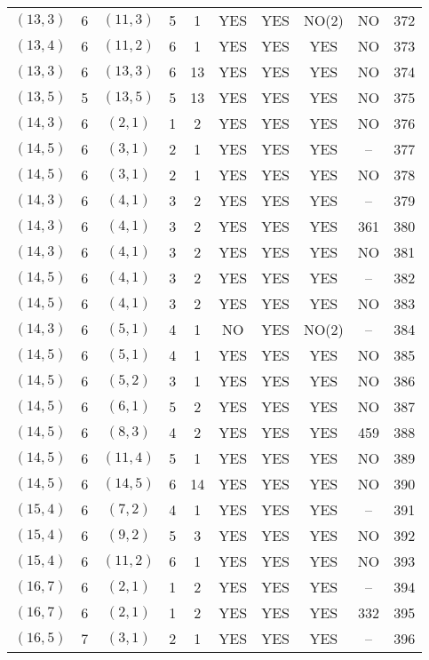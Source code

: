 \begin{longtable}{|c|c|c|c|c|c|c|c|c|c|}
$(13, 3)$ & 6 & $(11, 3)$ & 5 & 1 & YES & YES & NO(2) & NO & 372\\
$(13, 4)$ & 6 & $(11, 2)$ & 6 & 1 & YES & YES & YES & NO & 373\\
$(13, 3)$ & 6 & $(13, 3)$ & 6 & 13 & YES & YES & YES & NO & 374\\
$(13, 5)$ & 5 & $(13, 5)$ & 5 & 13 & YES & YES & YES & NO & 375\\
$(14, 3)$ & 6 & $(2, 1)$ & 1 & 2 & YES & YES & YES & NO & 376\\
$(14, 5)$ & 6 & $(3, 1)$ & 2 & 1 & YES & YES & YES & -- & 377\\
$(14, 5)$ & 6 & $(3, 1)$ & 2 & 1 & YES & YES & YES & NO & 378\\
$(14, 3)$ & 6 & $(4, 1)$ & 3 & 2 & YES & YES & YES & -- & 379\\
$(14, 3)$ & 6 & $(4, 1)$ & 3 & 2 & YES & YES & YES & 361 & 380\\
$(14, 3)$ & 6 & $(4, 1)$ & 3 & 2 & YES & YES & YES & NO & 381\\
$(14, 5)$ & 6 & $(4, 1)$ & 3 & 2 & YES & YES & YES & -- & 382\\
$(14, 5)$ & 6 & $(4, 1)$ & 3 & 2 & YES & YES & YES & NO & 383\\
$(14, 3)$ & 6 & $(5, 1)$ & 4 & 1 & NO & YES & NO(2) & -- & 384\\
$(14, 5)$ & 6 & $(5, 1)$ & 4 & 1 & YES & YES & YES & NO & 385\\
$(14, 5)$ & 6 & $(5, 2)$ & 3 & 1 & YES & YES & YES & NO & 386\\
$(14, 5)$ & 6 & $(6, 1)$ & 5 & 2 & YES & YES & YES & NO & 387\\
$(14, 5)$ & 6 & $(8, 3)$ & 4 & 2 & YES & YES & YES & 459 & 388\\
$(14, 5)$ & 6 & $(11, 4)$ & 5 & 1 & YES & YES & YES & NO & 389\\
$(14, 5)$ & 6 & $(14, 5)$ & 6 & 14 & YES & YES & YES & NO & 390\\
$(15, 4)$ & 6 & $(7, 2)$ & 4 & 1 & YES & YES & YES & -- & 391\\
$(15, 4)$ & 6 & $(9, 2)$ & 5 & 3 & YES & YES & YES & NO & 392\\
$(15, 4)$ & 6 & $(11, 2)$ & 6 & 1 & YES & YES & YES & NO & 393\\
$(16, 7)$ & 6 & $(2, 1)$ & 1 & 2 & YES & YES & YES & -- & 394\\
$(16, 7)$ & 6 & $(2, 1)$ & 1 & 2 & YES & YES & YES & 332 & 395\\
$(16, 5)$ & 7 & $(3, 1)$ & 2 & 1 & YES & YES & YES & -- & 396\\

\end{longtable}
